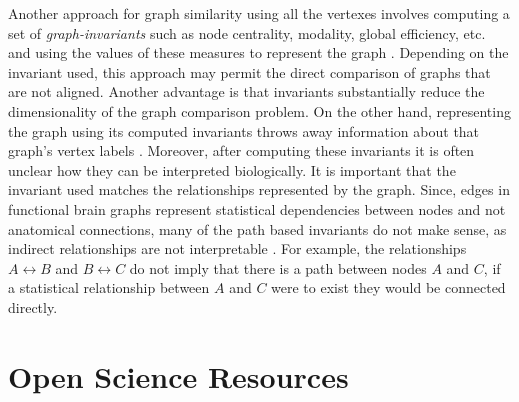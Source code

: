 Another approach for graph similarity using all the vertexes involves computing a set of \emph{graph-invariants} such as node centrality, modality, global efficiency, etc. and using the values of these measures to represent the graph \cite{rubinov}\cite{bullmoreReview}. Depending on the invariant used, this approach may permit the direct comparison of graphs that are not aligned. Another advantage is that invariants substantially reduce the dimensionality of the graph comparison problem. On the other hand, representing the graph using its computed invariants throws away information about that graph's vertex labels \cite{Vogelstein2012}. Moreover, after computing these invariants it is often unclear how they can be interpreted biologically. It is important that the invariant used matches the relationships represented by the graph. Since, edges in functional brain graphs represent statistical dependencies between nodes and not anatomical connections, many of the path based invariants do not make sense, as indirect relationships are not interpretable \cite{}. For example, the relationships $A \leftrightarrow B$ and $B \leftrightarrow C$ do not imply that there is a path between nodes $A$ and $C$, if a statistical relationship between $A$ and $C$ were to exist they would be connected directly.   


\section{Open Science Resources}

